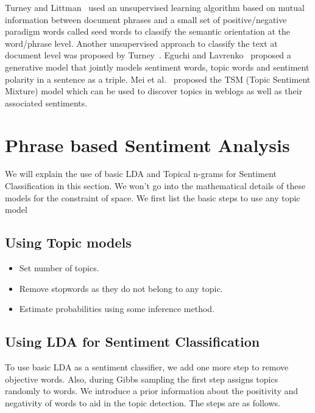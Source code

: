 \documentclass[11pt]{article}
\begin{document}
Turney and Littman~ used an unsupervised learning algorithm 
based on mutual information between document phrases and a small set of positive/negative 
paradigm words called seed words to classify the semantic orientation at the word/phrase 
level. Another unsupervised approach to classify the text at document level was proposed
by Turney~. Eguchi and Lavrenko~ 
proposed a generative model that jointly models sentiment words, topic words and sentiment
polarity in a sentence as a triple. Mei et al.~ proposed the TSM 
(Topic Sentiment Mixture) model which can be used to discover topics in weblogs as well as
their associated sentiments.


\section{Phrase based Sentiment Analysis}\label{process}

We will explain the use of basic LDA and Topical n-grams for Sentiment Classification in
this section. We won't go into the mathematical details of these models for the constraint 
of space. We first list the basic steps to use any topic model

\subsection{Using Topic models}

\begin{itemize}
 \itemsep0em
 \item Set number of topics.
 \item Remove stopwords as they do not belong to any topic.
 \item Estimate probabilities using some inference method.
\end{itemize}

\subsection{Using LDA for Sentiment Classification}

To use basic LDA as a sentiment classifier, we add one more step to remove objective words.
Also, during Gibbs sampling the first step assigns topics randomly to words. We introduce
a prior information about the positivity and negativity of words to aid in the topic
detection. The steps are as follows.
\end{document}
